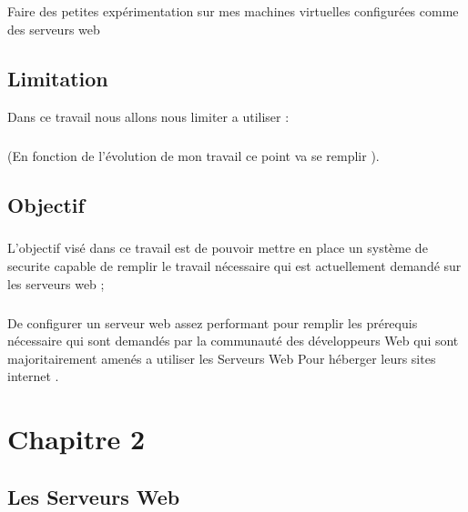 \documentclass{report}
\begin{document}
  \paragraph{ }
  Faire des petites expérimentation sur mes machines virtuelles configurées comme des serveurs web  
  \section{Limitation}
  Dans ce travail nous allons nous limiter a utiliser :
  \paragraph{ } (En fonction de l’évolution de mon travail ce point va se remplir ).
  \section{Objectif}
  
  \paragraph{ }L'objectif visé  dans ce travail est de pouvoir mettre en place un système de securite capable de remplir le travail nécessaire qui est actuellement demandé  sur les serveurs web ;
  \paragraph{ } De configurer un serveur web assez performant pour remplir les prérequis    nécessaire qui sont demandés par la communauté  des développeurs   Web qui sont majoritairement amenés a utiliser les Serveurs Web Pour héberger leurs sites internet  .
  
   \chapter*{Chapitre 2}
   \section{Les Serveurs Web}
\end{document}
